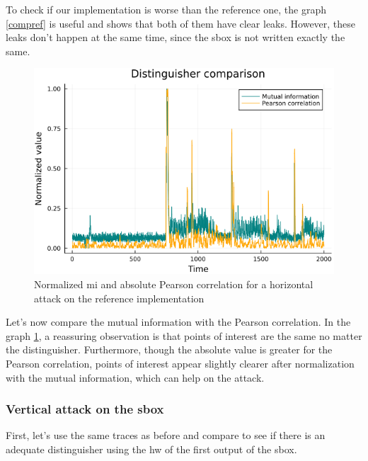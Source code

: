 \documentclass[11pt,technote]{IEEEtran}
\begin{document}
		To check if our implementation is worse than the reference one, the graph \ref{compref} is useful and shows that both of them have clear leaks. However, these leaks don't happen at the same time, since the \ac{sbox} is not written exactly the same. 
		
		\begin{figure}[H]
			\centering
			\includegraphics[scale=0.4]{img_files/corr_vs_MI_hHW}
			\caption{Normalized \ac{mi} and absolute Pearson correlation for a horizontal attack on the reference implementation}
			\label{corvsMI}
		\end{figure}
		
		Let's now compare the mutual information with the Pearson correlation. In the graph \ref{corvsMI}, a reassuring observation is that points of interest are the same no matter the distinguisher. Furthermore, though the absolute value is greater for the Pearson correlation, points of interest appear slightly clearer after normalization with the mutual information, which can help on the attack.
		
		\subsubsection{Vertical attack on the \ac{sbox}}
		First, let's use the same traces as before and compare to see if there is an adequate distinguisher using the \ac{hw} of the first output of the \ac{sbox}.
		
\end{document}
